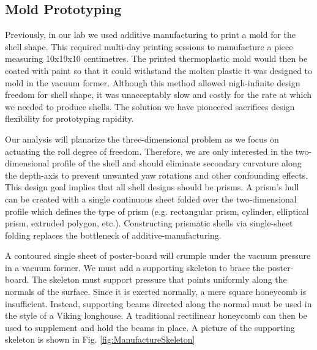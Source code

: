\documentclass[letterpaper]{report}
\begin{document}
\subsection{Mold Prototyping}
\label{sec:Molds}
Previously, in our lab we used additive manufacturing to print a mold for the shell shape.
This required multi-day printing sessions to manufacture a piece measuring 10x19x10 centimetres.
The printed thermoplastic mold would then be coated with paint so that it could withstand the molten plastic it was designed to mold in the vacuum former.
Although this method allowed nigh-infinite design freedom for shell shape, it was unacceptably slow and costly for the rate at which we needed to produce shells.
The solution we have pioneered sacrifices design flexibility for prototyping rapidity.

Our analysis will planarize the three-dimensional problem as we focus on actuating the roll degree of freedom.
Therefore, we are only interested in the two-dimensional profile of the shell and should eliminate secondary curvature along the depth-axis to prevent unwanted yaw rotations and other confounding effects.
This design goal implies that all shell designs should be prisms.
A prism's hull can be created with a single continuous sheet folded over the two-dimensional profile which defines the type of prism (e.g. rectangular prism, cylinder, elliptical prism, extruded polygon, etc.).
Constructing prismatic shells via single-sheet folding replaces the bottleneck of additive-manufacturing.

A contoured single sheet of poster-board will crumple under the vacuum pressure in a vacuum former.
We must add a supporting skeleton to brace the poster-board.
The skeleton must support pressure that points uniformly along the normals of the surface.
Since it is exerted normally, a mere square honeycomb is insufficient.
Instead, supporting beams directed along the normal must be used in the style of a Viking longhouse.
A traditional rectilinear honeycomb can then be used to supplement and hold the beams in place.
A picture of the supporting skeleton is shown in Fig. \ref{fig:ManufactureSkeleton}
\end{document}
